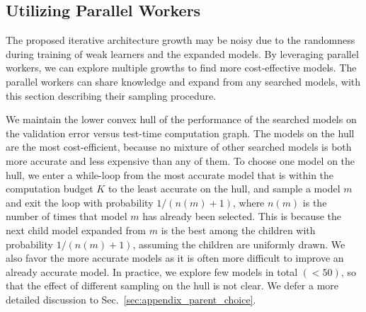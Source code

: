 \subsection{Utilizing Parallel Workers}
\label{sec:parent_choice}



The proposed iterative architecture growth may be noisy 
due to the randomness during training of weak learners and 
the expanded models. By leveraging parallel workers, we 
can explore multiple growths to find more cost-effective models. 
The parallel workers can share knowledge and expand from any searched models, 
with this section describing their sampling procedure.

We maintain the lower convex hull of the performance of the 
searched models on the validation error versus test-time computation 
graph. The models on the hull are the most cost-efficient, 
because no mixture of other searched models is both more accurate and less expensive
than any of them. To choose one model on the hull, we enter a while-loop
from the most accurate model that is within the computation 
budget $K$ to the least accurate on the hull, 
and sample a model $m$ and exit the loop with probability $1/(n(m) + 1)$, 
where $n(m)$ is the number of times that model $m$ has already been selected. 
This is because the next child model expanded from $m$ is the best among the children with probability
$1/(n(m) + 1)$, assuming the children are uniformly drawn. 
We also favor the more accurate models as it is often more difficult to 
improve an already accurate model. In practice, we explore few 
models in total $(<50)$, so that the effect of different sampling on the hull 
is not clear. We defer a more detailed discussion to Sec.~\ref{sec:appendix_parent_choice}.


